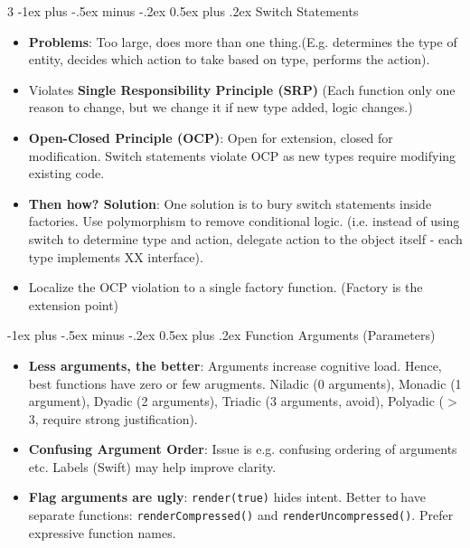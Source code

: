 \documentclass[a4paper, 9pt, landscape]{extarticle}
\makeatletter
\renewcommand{\subsection}{\@startsection{subsubsection}{3}{0mm}%
                                {-1ex plus -.5ex minus -.2ex}%
                                {0.5ex plus .2ex}%
                                {\normalfont\small\bfseries}}
\makeatother
\begin{document}
\begin{multicols*}{3}
\subsection{Switch Statements}
\begin{itemize}
\item \textbf{Problems}: Too large, does more than one thing.(E.g. determines the type of entity, decides which action to take based on type, performs the action).
\item Violates \textbf{Single Responsibility Principle (SRP)} (Each function only one reason to change, but we change it if new type added, logic changes.)
\item \textbf{Open-Closed Principle (OCP)}: Open for extension, closed for modification. Switch statements violate OCP as new types require modifying existing code.
\item \textbf{Then how? Solution}: One solution is to bury switch statements inside factories. Use polymorphism to remove conditional logic. (i.e. instead of using switch to determine type and action, delegate action to the object itself - each type implements XX interface).
\item Localize the OCP violation to a single factory function. (Factory is the extension point)
\end{itemize}


\subsection{Function Arguments (Parameters)}
\begin{itemize}
\item \textbf{Less arguments, the better}: Arguments increase cognitive load. Hence, best functions have zero or few arugments. Niladic (0 arguments),  Monadic (1 argument), Dyadic (2 arguments), Triadic (3 arguments, avoid), Polyadic ($>$3, require strong justification).
\item \textbf{Confusing Argument Order}: Issue is e.g. confusing ordering of arguments etc. Labels (Swift) may help improve clarity.
\item \textbf{Flag arguments are ugly}: \texttt{render(true)} hides intent. Better to have separate functions: \texttt{renderCompressed()} and \texttt{renderUncompressed()}. Prefer expressive function names.
\end{itemize}



\end{multicols*}
\end{document}
